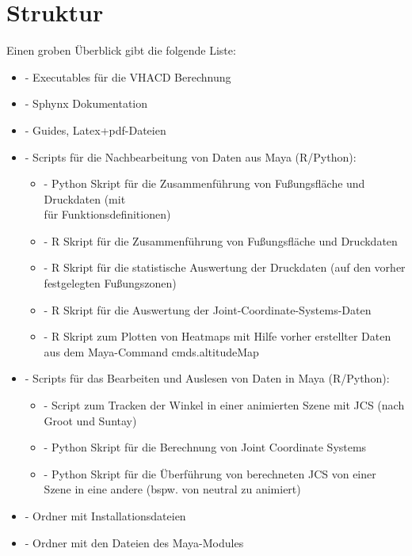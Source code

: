 \documentclass[a4paper, openany, oneside]{memoir}
\begin{document}
\section{Struktur}
Einen groben Überblick gibt die folgende Liste:
\begin{itemize}
\item {} - Executables für die VHACD Berechnung
\item {} - Sphynx Dokumentation
\item {} - Guides, Latex+pdf-Dateien
\item {} - Scripts für die Nachbearbeitung von Daten aus Maya (R/Python):
\begin{itemize}
\item {} - Python Skript für die Zusammenführung von Fußungsfläche und Druckdaten (mit \\  für Funktionsdefinitionen)
\item {} - R Skript für die Zusammenführung von Fußungsfläche und Druckdaten
\item {} - R Skript für die statistische Auswertung der Druckdaten (auf den vorher festgelegten Fußungszonen)
\item {} - R Skript für die Auswertung der Joint-Coordinate-Systems-Daten
\item {} - R Skript zum Plotten von Heatmaps mit Hilfe vorher erstellter Daten aus dem Maya-Command cmds.altitudeMap
\end{itemize}
\item {} - Scripts für das Bearbeiten und Auslesen von Daten in Maya (R/Python):
\begin{itemize}
\item {} - Script zum Tracken der Winkel in einer animierten Szene mit JCS (nach Groot und Suntay)
\item {} - Python Skript für die Berechnung von Joint Coordinate Systems
\item {} - Python Skript für die Überführung von berechneten JCS von einer Szene in eine andere (bspw. von neutral zu animiert)
\end{itemize}
\item {} - Ordner mit Installationsdateien
\item {} - Ordner mit den Dateien des Maya-Modules

\end{itemize}
\end{document}
